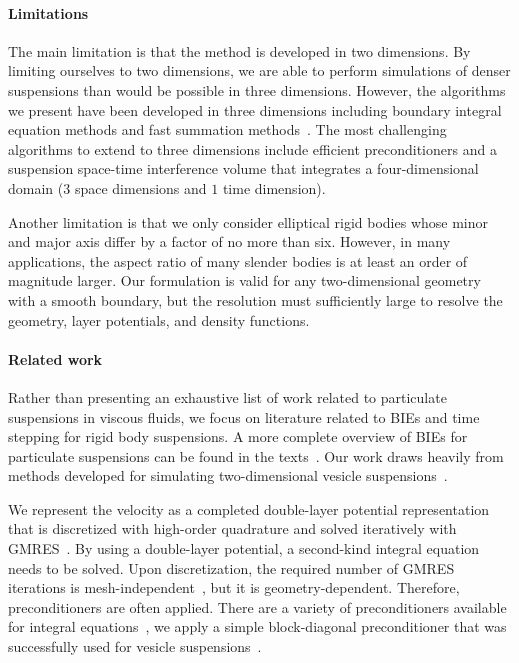 \documentclass[AMA,STIX1COL]{WileyNJD-v2}
\begin{document}
\paragraph{Limitations} The main limitation is that the method is
developed in two dimensions.  By limiting ourselves to two dimensions,
we are able to perform simulations of denser suspensions  than would be
possible in three dimensions.  However, the algorithms we present have
been developed in three dimensions including boundary integral equation
methods and fast summation methods~\cite{cor-gre-rac-vee2017,
kli-tor2014, kli-tor2016}.  The most challenging algorithms to extend to
three dimensions include efficient preconditioners and a suspension
space-time interference volume that integrates a four-dimensional domain
($3$ space dimensions and $1$ time dimension).

Another limitation is that we only consider elliptical rigid bodies
whose minor and major axis differ by a factor of no more than six.
However, in many applications, the aspect ratio of many slender bodies
is at least an order of magnitude larger.  Our formulation is valid for
any two-dimensional geometry with a smooth boundary, but the resolution
must sufficiently large to resolve the geometry, layer potentials, and
density functions.

\paragraph{Related work} Rather than presenting an exhaustive list of
work related to particulate suspensions in viscous fluids, we focus on
literature related to BIEs and time stepping for rigid body suspensions.
A more complete overview of BIEs for particulate suspensions can be
found in the texts~\cite{Pozrikidis1992, Guazzelli2011, Karrila1991}.
Our work draws heavily from methods developed for simulating
two-dimensional vesicle suspensions~\cite{Quaife2014, Quaife2015,
qua-bir2016, Rahimian2010, Lu2017}.  

We represent the velocity as a completed double-layer potential
representation~\cite{Power1987, Power1993, Karrila1989} that is
discretized with high-order quadrature and solved iteratively with
GMRES~\cite{Saad1986}.  By using a double-layer potential, a second-kind
integral equation needs to be solved.  Upon discretization, the required
number of GMRES iterations is mesh-independent~\cite{Campbell1996}, but
it is geometry-dependent.  Therefore, preconditioners are often applied.
There are a variety of preconditioners available for integral
equations~\cite{cou-pou-dar2017, che2000, qua-cou-dar2018, Quaife2015a,
bra-lub1990, hem-sch1981}, we apply a simple block-diagonal
preconditioner that was successfully used for vesicle
suspensions~\cite{Quaife2014}.
\end{document}
